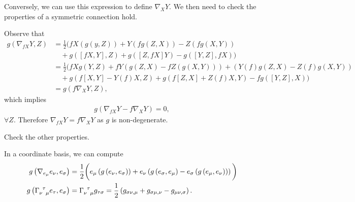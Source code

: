 Conversely, we can use this expression to define $\nabla_X Y$. We then need to check the properties of a symmetric connection hold.

\begin{example}
    Observe that
    \begin{align}
        g \left( \nabla_{fX} Y, Z \right) &= \frac{1}{2} \bigg( fX \left( g \left( y,Z \right)  \right) + Y \left( fg \left( Z,X \right)  \right) - Z \left( f g \left( X,Y \right)  \right) \nonumber \\
        &\quad  + g\left( \left[ fX, Y \right] ,Z \right) + g\left( \left[ Z, fX \right] Y \right) - g \left( \left[ Y, Z \right] ,fX \right)  \bigg)     \\
        &= \frac{1}{2} \bigg( f X g \left( Y,Z \right) + f Y \left( g \left( Z,X \right) - f Z\left( g \left( X,Y \right)  \right)  \right) + \left( Y \left( f \right) g\left( Z,X \right) - Z \left( f \right) g \left( X,Y \right)  \right) \nonumber  \\
            &\quad + g \left( f \left[ X, Y \right] - Y \left( f \right) X, Z \right) + g \left( f \left[ Z,X \right] + Z \left( f \right)X, Y \right) - f g \left( \left[ Y, Z \right] , X \right)   \bigg)\\
            &= g \left( f \nabla_X Y, Z \right)
    ,\end{align}
    which implies
    \begin{align}
        g \left( \nabla_{fX} Y - f \nabla_X Y \right) = 0
    ,\end{align}
    $\forall Z$. Therefore $\nabla_{fX} Y = f \nabla_X Y$ as $g$ is non-degenerate.
\end{example}

\begin{exercise}
    Check the other properties.
\end{exercise}

In a coordinate basis, we can compute
\begin{align}
    g \left( \nabla_{e_\mu} e_\nu, e_\sigma \right) &= \frac{1}{2} \bigg( e_\mu \left( g \left( e_\nu , e_\sigma \right)   \right) + e_\nu \left( g \left( e_\sigma, e_\mu \right) - e_\sigma \left( g \left( e_\mu , e_\nu \right)  \right)  \right)  \bigg) \\
    g \left( \tensor{\Gamma}{_{\nu}^{\tau}_\mu} e_{\tau} , e_{\sigma} \right) &= \tensor{\Gamma}{_{\nu}^{\tau}_{\mu}} g_{\tau \sigma} = \frac{1}{2} \left( g_{\sigma \nu, \mu} + g_{\sigma \mu, \nu} - g_{\mu \nu , \sigma} \right) 
.\end{align}

